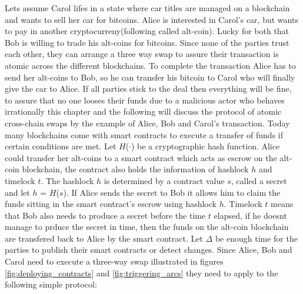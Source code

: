 Lets assume Carol lifes in a state where car titles are managed on a blockchain and wants to sell her car for bitcoins. Alice is interested in Carol's car, but wants to pay in another cryptocurreny(following called alt-coin). Lucky for both that Bob is willing to trade his alt-coins for bitcoins. Since none of the parties trust each other, they can arrange a three way swap to assure their transaction is atomic across the different blockchains. To complete the transaction Alice has to send her alt-coins to Bob, so he can transfer his bitcoin to Carol who will finally give the car to Alice. If all parties stick to the deal then everything will be fine, to assure that no one looses their funds due to a malicious actor who behaves irrationally this chapter and the following will discuss the protocol of atomic cross-chain swaps by the example of Alice, Bob and Carol's transaction. Today many blockchains come with smart contracts to execute a transfer of funds if certain conditions are met.
Let $H$($\cdot$) be a cryptographic hash function. Alice could transfer her alt-coins to a smart contract which acts as escrow on the alt-coin blockchain, the contract also holds the information of hashlock $h$ and timelock $t$. The hashlock $h$ is determined by a contract value $s$, called a secret and let $h$ = $H$($s$). If Alice sends the secret to Bob it allows him to claim the funds sitting in the smart contract's escrow using hashlock $h$. Timelock $t$ means that Bob also needs to produce a secret before the time $t$ elapsed, if he doesnt manage to prduce the secret in time, then the funds on the alt-coin blockchain are transfered back to Alice by the smart contract. Let $\Delta$ be enough time for the parties to publish their smart contracts or detect changes. Since Alice, Bob and Carol need to execute a three-way swap illustrated in figures \ref{fig:deploying_contracts} and \ref{fig:triggering_arcs} they need to apply to the following simple protocol: \newline


